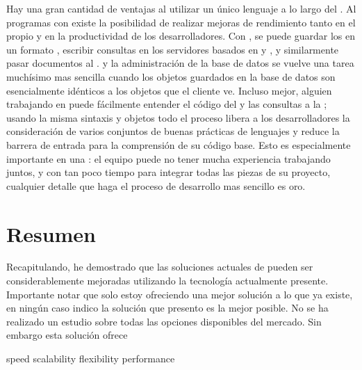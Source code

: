 Hay una gran cantidad de ventajas al utilizar un único lenguaje a lo largo del \stack. Al programas con \javaScriptNAME existe la posibilidad de realizar mejoras de rendimiento tanto en el propio \softwarePC y en la productividad de los desarrolladores. Con \mongodbNAME, se puede guardar los \documentsDB en un formato \jsonLikeCPT, escribir consultas \json en los servidores basados en \expressjsNAME y \nodejsNAME, y similarmente pasar documentos \json al \frontEndAS \angularjs. \debuggingPL y la administración de la base de datos se vuelve una tarea muchísimo mas sencilla cuando los objetos guardados en la base de datos son esencialmente idénticos a los objetos que el cliente \javaScriptNAME ve. Incluso mejor, alguien trabajando en \clientSide puede fácilmente entender el código del \serverSide y las consultas a la \dataBase; usando la misma sintaxis y objetos todo el proceso libera a los desarrolladores la consideración de varios conjuntos de buenas prácticas de lenguajes y reduce la barrera de entrada para la comprensión de su código base. Esto es especialmente importante en una \hackathonCPT: el equipo puede no tener mucha experiencia trabajando juntos, y con tan poco tiempo para integrar todas las piezas de su proyecto, cualquier detalle que haga el proceso de desarrollo mas sencillo es oro.


\section{Resumen}
Recapitulando, he demostrado que las soluciones actuales de \ecommerce pueden ser considerablemente mejoradas utilizando la tecnología actualmente presente. 
Importante notar que solo estoy ofreciendo una mejor solución a lo que ya existe, en ningún caso indico la solución que presento es la mejor posible. No se ha realizado un estudio sobre todas las opciones disponibles del mercado. Sin embargo esta solución ofrece

speed
scalability
flexibility
performance
